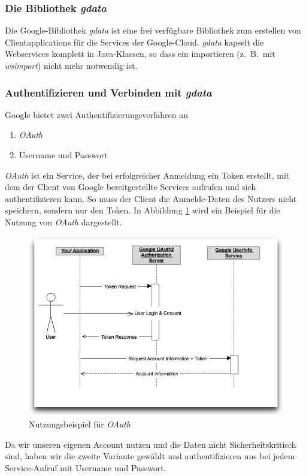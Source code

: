 \subsubsection{Die Bibliothek \emph{gdata}}
Die Google-Bibliothek \emph{gdata} ist eine frei verf\"ugbare Bibliothek zum erstellen von
 Clientapplications für die Services der Google-Cloud.
\emph{gdata} kapselt die Webservices komplett in Java-Klassen, so dass ein importieren
 (z.\ B.\ mit \emph{wsimport}) nicht mehr notwendig ist.

\subsubsection{Authentifizieren und Verbinden mit \emph{gdata}}
Google bietet zwei Authentifizierungsverfahren an
\begin{enumerate}
	\item\emph{OAuth}
	\item Username und Passwort
\end{enumerate}
\emph{OAuth} ist ein Service, der bei erfolgreicher Anmeldung ein Token erstellt, mit dem
 der Client von Google bereitgestellte Services aufrufen und sich authentifizieren kann.
So muss der Client die Anmelde-Daten des Nutzers nicht speichern, sondern nur den Token.
In Abbildung \ref{fig:google_oauth} wird ein Beispiel f\"ur die Nutzung von \emph{OAuth} dargestellt.
\begin{figure}[h!]
\includegraphics[width=\textwidth]{Bilder/googleOauth.png}
\caption{Nutzungsbeispiel f\"ur \emph{OAuth}\cite{GO01}}
\label{fig:google_oauth}
\end{figure}

Da wir unseren eigenen Account nutzen und die Daten nicht Sicherheitskritisch sind, haben
 wir die zweite Variante gew\"ahlt und authentifizieren uns bei jedem Service-Aufruf mit
 Username und Passwort.

